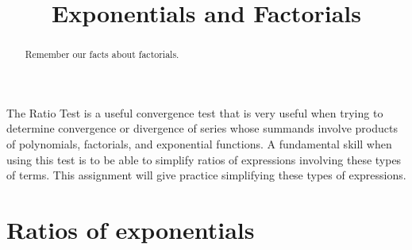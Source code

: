 \documentclass{ximera}
\title[Refresh:]{Exponentials and Factorials}
\begin{document}
\begin{abstract}
  Remember our facts about factorials.
\end{abstract}
\maketitle

\begin{exercise}
The Ratio Test is a useful convergence test that is very useful when trying to determine convergence or divergence of series whose summands involve products of polynomials, factorials, and exponential functions. A fundamental skill when using this test is to be able to simplify ratios of expressions involving these types of terms.  This assignment will give practice simplifying these types of expressions.


\begin{multipleChoice}
\end{multipleChoice}
\section{Ratios of exponentials}
\end{exercise}
\end{document}
